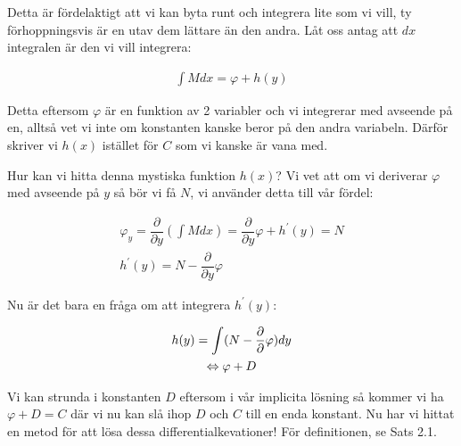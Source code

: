 \noindent Detta är fördelaktigt att vi kan byta runt och integrera lite som vi vill, ty förhoppningsvis är en utav dem lättare än den andra. Låt oss antag att $dx$ integralen är den vi vill integrera:


\begin{equation*}
  \begin{gathered}
    \int M dx = \varphi + h(y)
  \end{gathered}
\end{equation*}

\noindent Detta eftersom $\varphi$ är en funktion av 2 variabler och vi integrerar med avseende på en, alltså vet vi inte om konstanten kanske beror på den andra variabeln. Därför skriver vi $h(x)$ istället för $C$ som vi kanske är vana med.
\par\bigskip
\noindent Hur kan vi hitta denna mystiska funktion $h(x)$? Vi vet att om vi deriverar $\varphi$ med avseende på $y$ så bör vi få $N$, vi använder detta till vår fördel:


\begin{equation*}
  \begin{gathered}
    \varphi_y=\dfrac{\partial}{\partial y}\left(\int M dx\right)=\dfrac{\partial}{\partial y}\varphi+h^{\prime}(y)=N\\
    h^{\prime}(y)=N-\dfrac{\partial}{\partial y}\varphi
  \end{gathered}
\end{equation*}
\par\bigskip

\noindent Nu är det bara en fråga om att integrera $h^{\prime}(y)$:


\begin{equation*}
  \begin{gathered}
    h(y)=\int (N-\dfrac{\partial}{\partial}\varphi)dy\\
    \Leftrightarrow \varphi + D
  \end{gathered}
\end{equation*}
\par\bigskip

\noindent Vi kan strunda i konstanten $D$ eftersom i vår implicita lösning så kommer vi ha $\varphi + D = C$ där vi nu kan slå ihop $D$ och $C$ till en enda konstant. Nu har vi hittat en metod för att lösa dessa differentialkevationer! För definitionen, se Sats 2.1.







